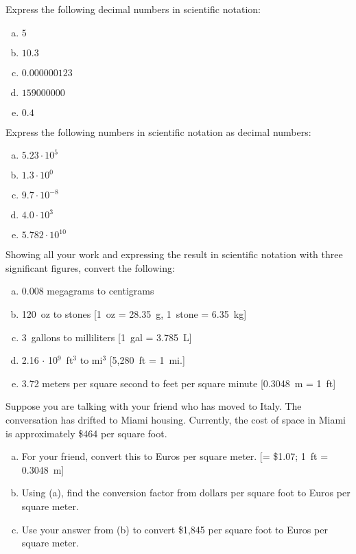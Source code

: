 \documentclass[11pt,letterpaper]{article}
\begin{document}

 Express the following decimal numbers in scientific notation:
	\begin{enumerate}[(a)]
	\item $5$
	\item $10.3$
	\item $0.000000123$
	\item $159000000$
	\item $0.4$
	\end{enumerate}



\newpage



 Express the following numbers in scientific notation as decimal numbers:
	\begin{enumerate}[(a)]
	\item $5.23 \cdot 10^5$
	\item $1.3 \cdot 10^0$
	\item $9.7 \cdot 10^{-8}$
	\item $4.0 \cdot 10^3$
	\item $5.782 \cdot 10^{10}$
	\end{enumerate}



\newpage



 Showing all your work and expressing the result in scientific notation with three significant figures, convert the following:
	\begin{enumerate}[(a)]
	\item 0.008 megagrams to centigrams
	\item 120~oz to stones [1~oz = 28.35~g, 1~stone = 6.35~kg]
	\item 3~gallons to milliliters [1~gal = 3.785~L]
	\item 2.16 $\cdot$ 10$^9$~ft$^3$ to mi$^3$ [5,280~ft = 1~mi.]
	\item 3.72 meters per square second to feet per square minute [0.3048~m = 1~ft]
	\end{enumerate}



\newpage



 Suppose you are talking with your friend who has moved to Italy. The conversation has drifted to Miami housing. Currently, the cost of space in Miami is approximately \$464 per square foot. 
	\begin{enumerate}[(a)]
	\item For your friend, convert this to Euros per square meter. [= \$1.07; 1~ft = 0.3048~m]
	\item Using (a), find the conversion factor from dollars per square foot to Euros per square meter. 
	\item Use your answer from (b) to convert \$1,845 per square foot to Euros per square meter. 
	\end{enumerate}
\end{document}
